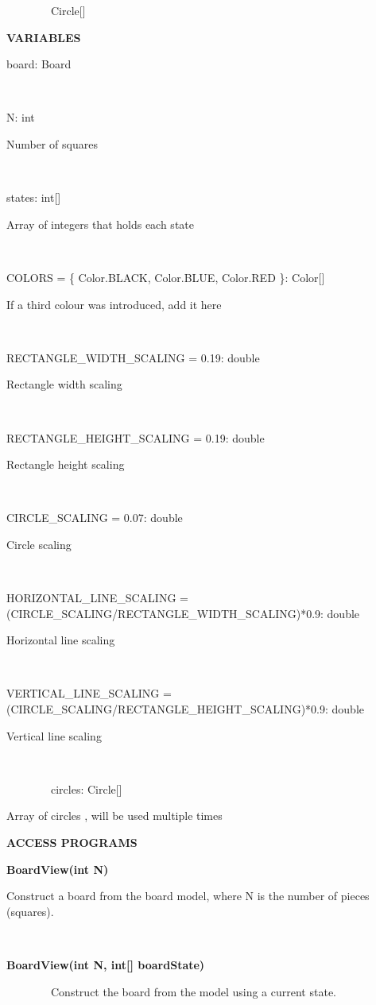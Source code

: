 \documentclass{article}
\begin{document}
{{~~~~~~~~Circle{[}{]}}

{\textbf{VARIABLES}}

{board: Board}

{~~~~~~~~}

{N: int}

{Number of squares}

{~~~~~~~~}

{states: int{[}{]}}

{Array of integers that holds each state}

{~~~~~~~~}

{COLORS = \{ Color.BLACK, Color.BLUE, Color.RED \}: Color{[}{]}}

{If a third colour was introduced, add it here}

{~}

{RECTANGLE\_WIDTH\_SCALING = 0.19: double }

{Rectangle width scaling}

{~~~~~~~~}

{RECTANGLE\_HEIGHT\_SCALING = 0.19: double}

{Rectangle height scaling}

{~~~~~~~~}

{CIRCLE\_SCALING = 0.07: double}

{Circle scaling}

{~~~~~~~~}

{HORIZONTAL\_LINE\_SCALING = (CIRCLE\_SCALING/RECTANGLE\_WIDTH\_SCALING)*0.9: double }

{Horizontal line scaling}

{~~~~~~~~}

{VERTICAL\_LINE\_SCALING = (CIRCLE\_SCALING/RECTANGLE\_HEIGHT\_SCALING)*0.9: double}

{Vertical line scaling}

{~~~~~~~~}

{~~~~~~~~circles: Circle{[}{]} }

{Array of circles , will be used multiple times}

{}

{\textbf{ACCESS PROGRAMS}}

{\textbf{BoardView(int N)}}

{Construct a board from the board model, where N is the number of pieces
(squares).}

{~}

{\textbf{BoardView(int N, int{[}{]} boardState)}}

{~~~~~~~~Construct the board from the model using a current state.}

}
\end{document}
